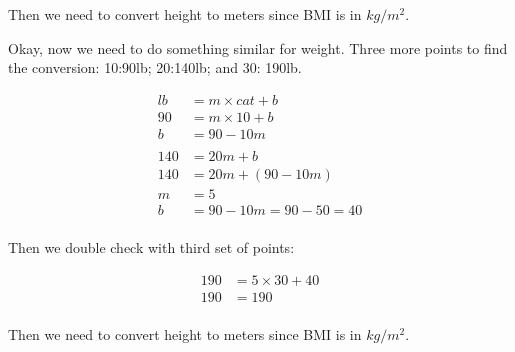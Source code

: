 \documentclass[
  letterpaper,
  DIV=11,
  numbers=noendperiod]{scrartcl}
\newenvironment{Shaded}{\begin{snugshade}}{\end{snugshade}}
\newcommand{\DecValTok}[1]{\textcolor[rgb]{0.68,0.00,0.00}{#1}}
\newcommand{\FloatTok}[1]{\textcolor[rgb]{0.68,0.00,0.00}{#1}}
\newcommand{\NormalTok}[1]{\textcolor[rgb]{0.00,0.23,0.31}{#1}}
\newcommand{\OtherTok}[1]{\textcolor[rgb]{0.00,0.23,0.31}{#1}}
\newcommand{\SpecialCharTok}[1]{\textcolor[rgb]{0.37,0.37,0.37}{#1}}
\begin{document}
Then we need to convert height to meters since BMI is in \(kg/m^2\).

\begin{Shaded}
\end{Shaded}

Okay, now we need to do something similar for weight. Three more points
to find the conversion: 10:90lb; 20:140lb; and 30: 190lb.

\[
\begin{align}
lb & = m\times cat+b \\
90 &= m \times 10 + b \\
b & = 90-10m \\
\\
140 &= 20m + b \\
140 &= 20m + (90-10m) \\
m &=5 \\ 
b&=90-10m = 90-50=40 \\
\end{align}
\]

Then we double check with third set of points:

\[
\begin{align}
190 & = 5 \times 30 + 40 \\
190 & = 190 \\
\end{align}
\]

\begin{Shaded}
\end{Shaded}

Then we need to convert height to meters since BMI is in \(kg/m^2\).

\begin{Shaded}
\end{Shaded}
\end{document}
